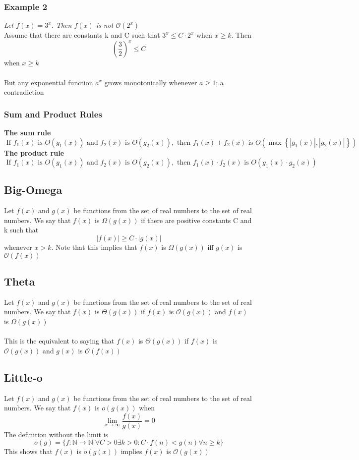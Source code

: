\documentclass{article}[18pt]
\begin{document}
\subsubsection{Example 2}
\textit{Let $f(x)=3^x$. Then $f(x)$ is not $\mathcal{O}(2^x)$ }\\
Assume that there are constants k and C such that $3^x\leqslant C\cdot 2^x$ when $x\geqslant k$. Then
\[
\left(\frac{3}{2}\right)^{x} \leq C
\]
when $x\geqslant k$\\
\\
But any exponential function $a^x$ grows monotonically whenever $a\geqslant 1$; a contradiction
\subsubsection{Sum and Product Rules}
\textbf{The sum rule}
\[
\text { If } f_{1}(x) \text { is } O\left(g_{1}(x)\right) \text { and } f_{2}(x) \text { is } O\left(g_{2}(x)\right), \text { then } f_{1}(x)+f_{2}(x) \text { is } O\left(\max \left\{\left|g_{1}(x)\right|,\left|g_{2}(x)\right|\right\}\right)
\]
\textbf{The product rule}
\[
\text { If } f_{1}(x) \text { is } O\left(g_{1}(x)\right) \text { and } f_{2}(x) \text { is } O\left(g_{2}(x)\right), \text { then } f_{1}(x) \cdot f_{2}(x) \text { is } O\left(g_{1}(x) \cdot g_{2}(x)\right)
\]
\subsection{Big-Omega}
Let $f(x)$ and $g(x)$ be functions from the set of real numbers to the set of real numbers. We say that $f(x)$ is $\Omega(g(x))$ if there are positive constants C and k such that
\[
|f(x)| \geq C \cdot|g(x)|
\]
whenever $x>k$. Note that this implies that $f(x)$ is $\Omega(g(x))$ iff $g(x)$ is $\mathcal{O}(f(x))$
\subsection{Theta}
Let $f(x)$ and $g(x)$ be functions from the set of real numbers to the set of real numbers. We say that $f(x)$ is $\Theta(g(x))$ if $f(x)$ is $\mathcal{O}(g(x))$ and $f(x)$ is $\Omega(g(x))$\\
\\
This is the equivalent to saying that $f(x)$ is $\Theta(g(x))$ if $f(x)$ is $\mathcal{O}(g(x))$ and $g(x)$ is $\mathcal{O}(f(x))$
\subsection{Little-o}
Let $f(x)$ and $g(x)$ be functions from the set of real numbers to the set of real numbers. We say that $f(x)$ is $o(g(x))$ when
\[
\lim _{x \rightarrow \infty} \frac{f(x)}{g(x)}=0
\]
The definition without the limit is
\[
o(g)=\{f : \mathbb{N} \rightarrow \mathbb{N} | \forall C>0 \exists k>0 : C \cdot f(n)<g(n) \forall n \geq k\}
\]
This shows that $f(x)$ is $o(g(x))$ implies $f(x)$ is $\mathcal{O}(g(x))$
\end{document}
